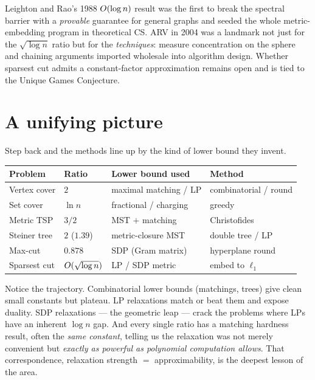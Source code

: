 \begin{historybox}
Leighton and Rao's 1988 $O(\log n)$ result was the first to break the spectral barrier with a
\emph{provable} guarantee for general graphs and seeded the whole metric-embedding program in
theoretical CS. ARV in 2004 was a landmark not just for the $\sqrt{\log n}$ ratio but for the
\emph{techniques}: measure concentration on the sphere and chaining arguments imported wholesale into
algorithm design. Whether sparsest cut admits a constant-factor approximation remains open and is tied
to the Unique Games Conjecture.
\end{historybox}

\section{A unifying picture}

Step back and the methods line up by the kind of lower bound they invent.

\begin{center}
\begin{tabular}{llll}
\toprule
Problem & Ratio & Lower bound used & Method \\
\midrule
Vertex cover & $2$ & maximal matching / LP & combinatorial / round \\
Set cover & $\ln n$ & fractional / charging & greedy \\
Metric TSP & $3/2$ & MST $+$ matching & Christofides \\
Steiner tree & $2$ ($1.39$) & metric-closure MST & double tree / LP \\
Max-cut & $0.878$ & SDP (Gram matrix) & hyperplane round \\
Sparsest cut & $O(\sqrt{\log n})$ & LP / SDP metric & embed to $\ell_1$ \\
\bottomrule
\end{tabular}
\end{center}

\begin{aestheticbox}
Notice the trajectory. Combinatorial lower bounds (matchings, trees) give clean small constants but
plateau. LP relaxations match or beat them and expose duality. SDP relaxations --- the geometric leap
--- crack the problems where LPs have an inherent $\log n$ gap. And every single ratio has a matching
hardness result, often the \emph{same constant}, telling us the relaxation was not merely convenient
but \emph{exactly as powerful as polynomial computation allows}. That correspondence, relaxation
strength $=$ approximability, is the deepest lesson of the area.
\end{aestheticbox}

